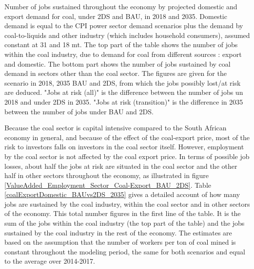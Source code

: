 \documentclass[12pt,english]{article}
\begin{document}
\begin{table}[!t]
	\caption{\label{coalExportDomestic_BAUvs2DS_2035}Number of jobs sustained throughout the economy by projected domestic and export demand for coal, under 2DS and BAU, in 2018 and 2035. Domestic demand is equal to the CPI power sector demand scenarios plus the demand by coal-to-liquids and other industry (which includes household consumers), assumed constant at 31 and 18 mt. The top part of the table shows the number of jobs within the coal industry, due to demand for coal from different sources : export and domestic. The bottom part shows the number of jobs sustained by coal demand in sectors other than the coal sector. The figures are given for the scenario in 2018, 2035 BAU and 2DS, from which the jobs possibly lost/at risk are deduced. "Jobs at risk (all)" is the difference between the number of jobs un 2018 and under 2DS in 2035. "Jobs at risk (transition)" is the difference in 2035 between the number of jobs under BAU and 2DS.}
\end{table}

Because the coal sector is capital intensive compared to the South African economy in general, and because of the effect of the coal-export price, most of the risk to investors falls on investors in the coal sector itself. However, employment by the coal sector is not affected by the coal export price. In terms of possible job losses, about half the jobs at risk are situated in the coal sector and the other half in other sectors throughout the economy, as illustrated in figure \ref{ValueAdded_Employment_Sector_Coal-Export_BAU_2DS}. Table \ref{coalExportDomestic_BAUvs2DS_2035} gives a detailed account of how many jobs are sustained by the coal industry, within the coal sector and in other sectors of the economy. This total number figures in the first line of the table. It is the sum of the jobs within the coal industry (the top part of the table) and the jobs sustained by the coal industry in the rest of the economy. The estimates are based on the assumption that the number of workers per ton of coal mined is constant throughout the modeling period, the same for both scenarios and equal to the average over 2014-2017.
\end{document}
